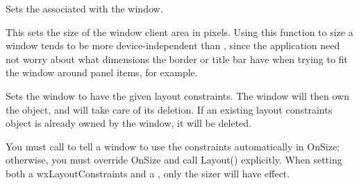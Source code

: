 \label{wxwindowsetcaret}


Sets the  associated with the window.


\label{wxwindowsetclientsize}



This sets the size of the window client area in pixels. Using this function to size a window
tends to be more device-independent than , since the application need not
worry about what dimensions the border or title bar have when trying to fit the window
around panel items, for example.







\label{wxwindowsetconstraints}


Sets the window to have the given layout constraints. The window
will then own the object, and will take care of its deletion.
If an existing layout constraints object is already owned by the
window, it will be deleted.




You must call  to tell a window to use
the constraints automatically in OnSize; otherwise, you must override OnSize and call Layout()
explicitly. When setting both a wxLayoutConstraints and a , only the
sizer will have effect.


